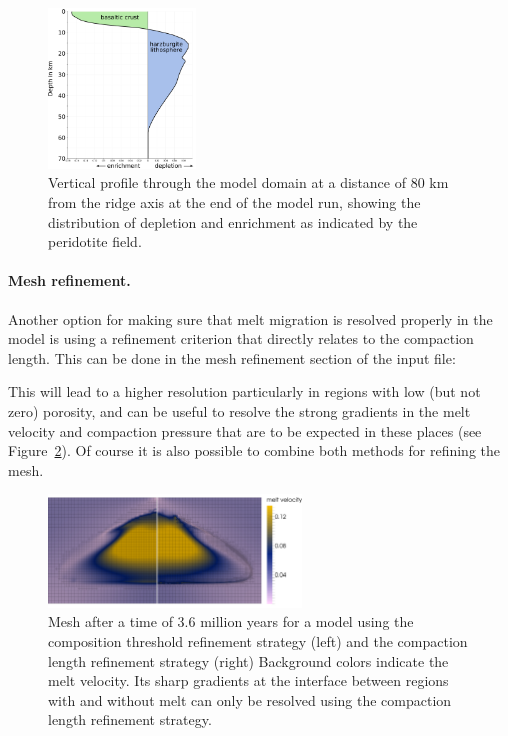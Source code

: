 \documentclass{article}
\begin{document}
\begin{figure}
    \centering
    \includegraphics[width=0.35\textwidth]{cookbooks/mid_ocean_ridge/depletion_profile.pdf}
    \caption{Vertical profile through the model domain at a distance of 80 km from the ridge axis
             at the end of the model run, showing the distribution of depletion and enrichment as
             indicated by the peridotite field.}
    \label{fig:mid-ocean-ridge-profile}
\end{figure}

\paragraph{Mesh refinement.}
Another option for making sure that melt migration is resolved properly in the model is using a 
refinement criterion that directly relates to the compaction length. This can be done in the mesh 
refinement section of the input file:



This will lead to a higher resolution particularly in regions with low (but not zero) porosity, 
and can be useful to resolve the strong gradients in the melt velocity and compaction pressure that 
are to be expected in these places (see Figure~\ref{fig:mid-ocean-ridge-mesh}). 
Of course it is also possible to combine both methods for refining the mesh. 

\begin{figure}
    \centering
    \includegraphics[width=0.6\textwidth]{cookbooks/mid_ocean_ridge/refinement.pdf}
    \caption{Mesh after a time of 3.6 million years for a model using the composition threshold 
             refinement strategy (left) and the compaction length refinement strategy (right)
             Background colors indicate the melt velocity. Its sharp gradients at the interface 
             between regions with and without melt can only be resolved using the compaction 
             length refinement strategy.}
    \label{fig:mid-ocean-ridge-mesh}
\end{figure}
\end{document}
